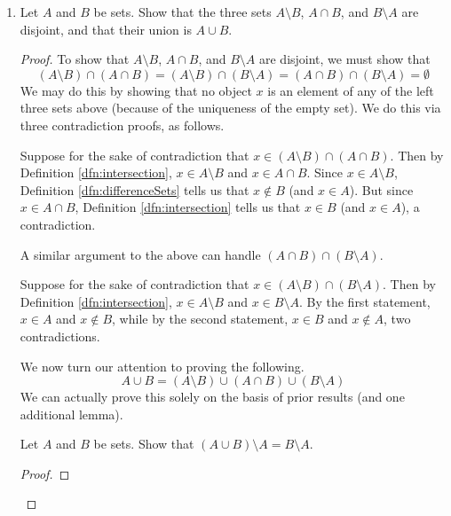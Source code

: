 \documentclass[../main.tex]{subfiles}
\begin{document}
\begin{enumerate}[ref={\thesection.\arabic*}]
\begin{proof}
    \end{proof}
    \item \label{exr:3.1.10}Let $A$ and $B$ be sets. Show that the three sets $A\setminus B$, $A\cap B$, and $B\setminus A$ are disjoint, and that their union is $A\cup B$.
    \begin{proof}
        To show that $A\setminus B$, $A\cap B$, and $B\setminus A$ are disjoint, we must show that
        \begin{equation*}
            (A\setminus B)\cap(A\cap B) = (A\setminus B)\cap(B\setminus A)
            = (A\cap B)\cap(B\setminus A)
            = \emptyset
        \end{equation*}
        We may do this by showing that no object $x$ is an element of any of the left three sets above (because of the uniqueness of the empty set). We do this via three contradiction proofs, as follows.\par
        Suppose for the sake of contradiction that $x\in(A\setminus B)\cap(A\cap B)$. Then by Definition \ref{dfn:intersection}, $x\in A\setminus B$ and $x\in A\cap B$. Since $x\in A\setminus B$, Definition \ref{dfn:differenceSets} tells us that $x\notin B$ (and $x\in A$). But since $x\in A\cap B$, Definition \ref{dfn:intersection} tells us that $x\in B$ (and $x\in A$), a contradiction.\par
        A similar argument to the above can handle $(A\cap B)\cap(B\setminus A)$.\par
        Suppose for the sake of contradiction that $x\in (A\setminus B)\cap(B\setminus A)$. Then by Definition \ref{dfn:intersection}, $x\in A\setminus B$ and $x\in B\setminus A$. By the first statement, $x\in A$ and $x\notin B$, while by the second statement, $x\in B$ and $x\notin A$, two contradictions.\par
        We now turn our attention to proving the following.
        \begin{equation*}
            A\cup B = (A\setminus B)\cup(A\cap B)\cup(B\setminus A)
        \end{equation*}
        We can actually prove this solely on the basis of prior results (and one additional lemma).
        \begin{lem}\label{lem:unionMinus}
            Let $A$ and $B$ be sets. Show that $(A\cup B)\setminus A=B\setminus A$.
            \begin{proof}

\end{proof}
\end{lem}
\end{proof}
\end{enumerate}
\end{document}
